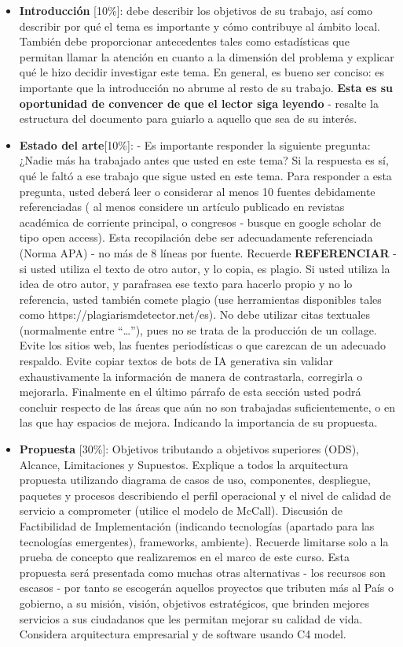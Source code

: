 \begin{itemize}
\begin{itemize}
        \item \textbf{Introducción} [10\%]: debe describir los objetivos de su trabajo, así como describir por qué el tema es importante y cómo contribuye al ámbito local. También debe proporcionar antecedentes tales como estadísticas que permitan llamar la atención en cuanto a la dimensión del problema y explicar qué le hizo decidir investigar este tema. En general, es bueno ser conciso: es importante que la introducción no abrume al resto de su trabajo. \textbf{Esta es su oportunidad de convencer de que el lector siga leyendo}  - resalte la estructura del documento para guiarlo a aquello que sea de su interés.
        
        
        \item \textbf{Estado del arte}[10\%]: -  Es importante responder la siguiente pregunta: ¿Nadie más ha trabajado antes que usted en este tema? Si la respuesta es sí, qué le faltó a ese trabajo que sigue usted en este tema. Para responder a esta pregunta, usted deberá leer o considerar al menos 10 fuentes debidamente referenciadas ( al menos considere un  artículo publicado en revistas académica de corriente principal, o congresos - busque en google scholar de tipo open access).  Esta recopilación debe ser adecuadamente referenciada (Norma APA) - no más de 8 líneas por fuente. Recuerde \textbf{REFERENCIAR} - si usted utiliza el texto de otro autor, y lo copia, es plagio. Si usted utiliza la idea de otro autor, y parafrasea ese texto para hacerlo propio y no lo referencia, usted también comete plagio (use herramientas disponibles tales como https://plagiarismdetector.net/es). No debe utilizar citas textuales (normalmente entre “…”), pues no se trata de la producción de un collage. Evite los sitios web, las fuentes periodísticas o que carezcan de un adecuado respaldo. Evite copiar textos de bots de IA generativa sin validar exhaustivamente la información de manera de contrastarla, corregirla o mejorarla. Finalmente en el último párrafo de esta sección usted podrá concluir respecto de las áreas que aún no son trabajadas suficientemente, o en las que hay espacios de mejora. Indicando la importancia de su propuesta. 


        \item \textbf{Propuesta} [30\%]: Objetivos tributando a objetivos superiores (ODS), Alcance, Limitaciones y Supuestos. Explique a todos la arquitectura propuesta utilizando diagrama de casos de uso, componentes, despliegue, paquetes y procesos describiendo el perfil operacional y el nivel de calidad de servicio a comprometer (utilice el modelo de McCall).  Discusión de Factibilidad de Implementación (indicando tecnologías (apartado para las tecnologías emergentes), frameworks, ambiente). Recuerde limitarse solo a la prueba de concepto que realizaremos en el marco de este curso. Esta propuesta será presentada como muchas otras alternativas - los recursos son escasos - por tanto se escogerán aquellos proyectos que tributen más al País o gobierno, a su misión, visión, objetivos estratégicos, que brinden mejores servicios a sus ciudadanos que les permitan mejorar su calidad de vida. Considera arquitectura empresarial y de software usando C4 model.

\end{itemize}
\end{itemize}
